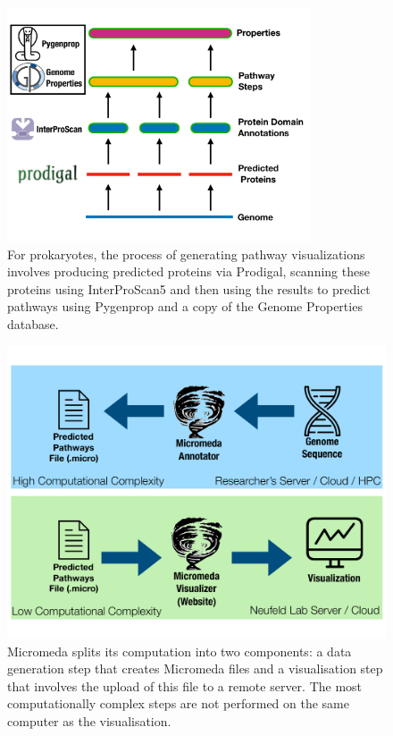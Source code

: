 \begin{figure}[!ht]
  \centering
	\includegraphics[width=0.8\textwidth]{media/micromeda-pipeline.pdf}
	 \caption{For prokaryotes, the process of generating pathway visualizations involves producing predicted proteins via Prodigal, scanning these proteins using InterProScan5 and then using the results to predict pathways using Pygenprop and a copy of the Genome Properties database.}
	 \label{fig:micromeda-levels}
\end{figure}

\begin{figure}[!ht]
  \centering
	\includegraphics[width=\textwidth]{media/micromeda-file-generation.pdf}
	 \caption{Micromeda splits its computation into two components: a data generation step that creates Micromeda files and a visualisation step that involves the upload of this file to a remote server. The most computationally complex steps are not performed on the same computer as the visualisation.}
	 \label{fig:micromeda-file-generation}
\end{figure}

